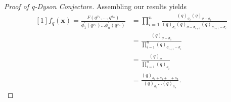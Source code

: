 \begin{proof}[Proof of q-Dyson Conjecture]
	Assembling our results yields
	\begin{align*}
	\left[ 1 \right] f_{q}\left( \textbf{x} \right) = \frac{F\left( q^{\sigma_1}, \ldots, q^{\sigma_{n}}  \right) }{\phi_1^{\prime}\left( q^{\sigma_1} \right) \ldots \phi _{n}^{\prime} \left( q^{\sigma_{n}} \right) } &=  \prod_{i= 1}^{n} \frac{\left( q \right) _{\sigma_{i}} \left( q \right) _{\sigma - \sigma_{i}} }{\left( q \right) _{\sigma_{i}} \left( q \right) _{\sigma - \sigma_{i + 1}} \left( q \right) _{\sigma_{i + 1} - \sigma_{i}}} \\
																											     &= \frac{\left( q \right) _{\sigma - \sigma_1}}{\prod_{i= 1}^{n}\left( q \right) _{\sigma_{i + 1} - \sigma_{i}}} \\
																											     &= \frac{\left( q \right) _{\sigma}}{ \prod_{i= 1}^{n} \left( q \right)_{a_{i}} } \\
																											     &= \frac{\left( q \right) _{a_1 + a_2 + \ldots + a_{n}}}{ \left( q \right) _{a_1} \ldots \left( q \right) _{a_{n}}}
	.\end{align*}
\end{proof}
